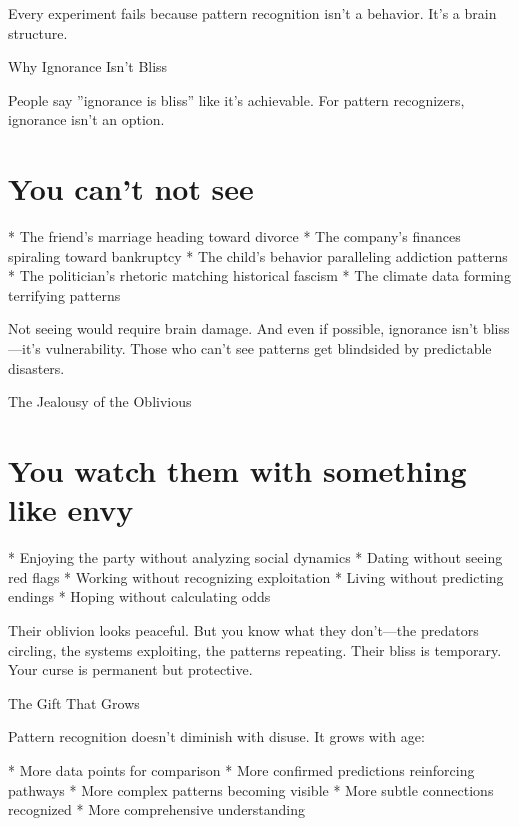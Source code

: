 \documentclass[12pt,oneside]{book}
\begin{document}
Every experiment fails because pattern recognition isn't a behavior. It's a brain structure.

Why Ignorance Isn't Bliss

People say ''ignorance is bliss'' like it's achievable. For pattern recognizers, ignorance isn't an option.

\section{You can't not see}

                    * The friend's marriage heading toward divorce
                    * The company's finances spiraling toward bankruptcy
                    * The child's behavior paralleling addiction patterns
                    * The politician's rhetoric matching historical fascism
                    * The climate data forming terrifying patterns

Not seeing would require brain damage. And even if possible, ignorance isn't bliss---it's vulnerability. Those who can't see patterns get blindsided by predictable disasters.

The Jealousy of the Oblivious

\section{You watch them with something like envy}

                    * Enjoying the party without analyzing social dynamics
                    * Dating without seeing red flags
                    * Working without recognizing exploitation
                    * Living without predicting endings
                    * Hoping without calculating odds

Their oblivion looks peaceful. But you know what they don't---the predators circling, the systems exploiting, the patterns repeating. Their bliss is temporary. Your curse is permanent but protective.

The Gift That Grows

Pattern recognition doesn't diminish with disuse. It grows with age:

                    * More data points for comparison
                    * More confirmed predictions reinforcing pathways
                    * More complex patterns becoming visible
                    * More subtle connections recognized
                    * More comprehensive understanding
\end{document}
